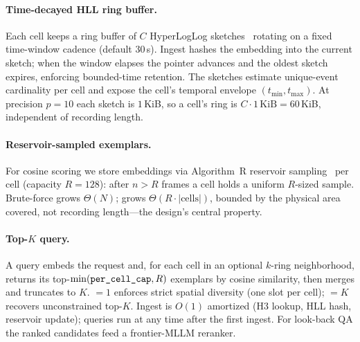\paragraph{Time-decayed HLL ring buffer.}
Each cell keeps a ring buffer of $C$ HyperLogLog
sketches~\cite{flajolet2007hyperloglog} rotating on a fixed time-window
cadence (default 30\,s). Ingest hashes the embedding into the current
sketch; when the window elapses the pointer advances and the oldest sketch
expires, enforcing bounded-time retention. The sketches estimate
unique-event cardinality per cell and expose the cell's temporal envelope
$(t_{\min}, t_{\max})$. At precision $p{=}10$ each sketch is $1\,$KiB, so
a cell's ring is $C\cdot1\,\mathrm{KiB} = 60\,$KiB, independent of
recording length.

\paragraph{Reservoir-sampled exemplars.}
For cosine scoring we store embeddings via Algorithm~R reservoir
sampling~\cite{vitter1985reservoir} per cell (capacity $R{=}128$): after
$n > R$ frames a cell holds a uniform $R$-sized sample. Brute-force grows
$\Theta(N)$; \psm{} grows $\Theta(R\cdot|\mathrm{cells}|)$, bounded by the
physical area covered, not recording length---the design's central
property.

\paragraph{Top-$K$ query.}
A query embeds the request and, for each cell in an optional
$k$-ring neighborhood, returns its top-$\min(\texttt{per\_cell\_cap}, R)$ exemplars by
cosine similarity, then merges and truncates to $K$. \caponek{}$=1$
enforces strict spatial diversity (one slot per cell); \caponek{}$=K$
recovers unconstrained top-$K$. Ingest is $O(1)$ amortized (H3 lookup, HLL
hash, reservoir update); queries run at any time after the first ingest.
For look-back QA the ranked candidates feed a frontier-MLLM reranker.


